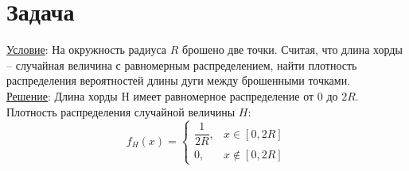 \documentclass[a4paper,12pt]{article} %
\begin{document}
\newpage
\section{Задача}
\underline{Условие}: На окружность радиуса $R$ брошено две точки. Считая, что длина хорды – случайная величина с равномерным распределением, найти плотность распределения вероятностей длины дуги между брошенными точками.\\
\underline{Решение}:
Длина хорды H имеет равномерное распределение от $0$ до $2R$. Плотность распределения случайной величины $H$:
\[
	f_H(x) = 
	\begin{cases}
		\dfrac{1}{2R}, &x \in [0,2R]\\
		0, &x \notin [0, 2R]
	\end{cases}
\]
\end{document}
